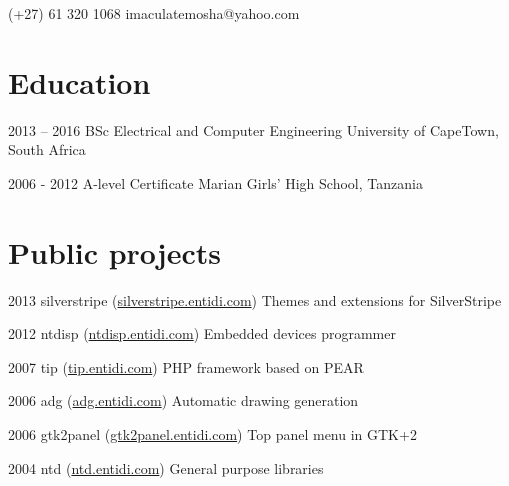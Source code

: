 \documentclass[fontsize=10pt]{tccv}
\begin{document}
    {(+27) 61 320 1068}
    {imaculatemosha@yahoo.com}

\section{Education}

\begin{yearlist}

\item{2013 -- 2016}
     {BSc Electrical and Computer Engineering}
     {University of CapeTown, South Africa}

\item{2006 - 2012}
     {A-level Certificate}
     {Marian Girls' High School, Tanzania}

\end{yearlist}

\section{Public projects}

\begin{yearlist}

\item{2013}
     {silverstripe (\href{http://silverstripe.entidi.com/}{silverstripe.entidi.com})}
     {Themes and extensions for SilverStripe}

\item{2012}
     {ntdisp (\href{http://ntdisp.entidi.com/}{ntdisp.entidi.com})}
     {Embedded devices programmer}

\item{2007}
     {tip (\href{http://tip.entidi.com/}{tip.entidi.com})}
     {PHP framework based on PEAR}

\item{2006}
     {adg (\href{http://adg.entidi.com/}{adg.entidi.com})}
     {Automatic drawing generation}

\item{2006}
     {gtk2panel (\href{http://gtk2panel.entidi.com/}{gtk2panel.entidi.com})}
     {Top panel menu in GTK+2}

\item{2004}
     {ntd (\href{http://ntd.entidi.com/}{ntd.entidi.com})}
     {General purpose libraries}

\end{yearlist}
\end{document}
